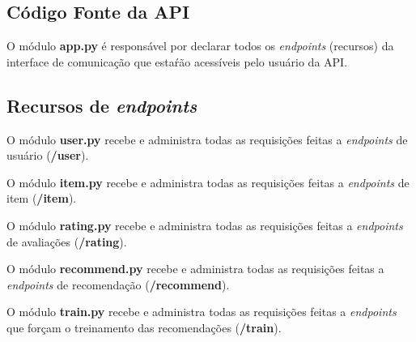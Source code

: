 \documentclass[12pt, openright, oneside, a4paper, brazil]{abntex2}
\begin{document}
\begin{apendicesenv}
	

\chapter{Código Fonte da API}

O módulo \textbf{app.py} é responsável por declarar todos os \textit{endpoints} (recursos) da interface de comunicação que estaŕão acessíveis pelo usuário da API.



\section{Recursos de \textit{endpoints}} \label{endpoint_resources}

O módulo \textbf{user.py} recebe e administra todas as requisições feitas a \textit{endpoints} de usuário (\textbf{/user}).



O módulo \textbf{item.py} recebe e administra todas as requisições feitas a \textit{endpoints} de item (\textbf{/item}).



O módulo \textbf{rating.py} recebe e administra todas as requisições feitas a \textit{endpoints} de avaliações (\textbf{/rating}).



O módulo \textbf{recommend.py} recebe e administra todas as requisições feitas a \textit{endpoints} de recomendação (\textbf{/recommend}).



O módulo \textbf{train.py} recebe e administra todas as requisições feitas a \textit{endpoints} que forçam o treinamento das recomendações (\textbf{/train}).




\end{apendicesenv}
\end{document}
